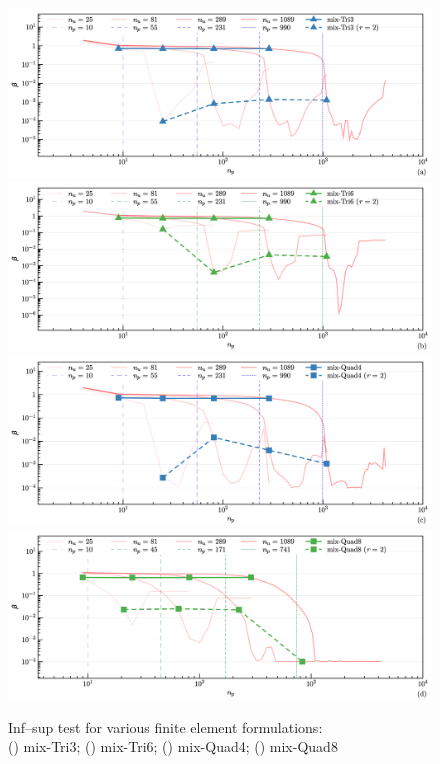 \begin{figure}[!ht]
\centering
\begin{subcaptiongroup}
\includegraphics[width=\textwidth]{png/infsup_tri3.png}\label{a}
\includegraphics[width=\textwidth]{png/infsup_tri6.png}\label{b}
\includegraphics[width=\textwidth]{png/infsup_quad.png}\label{c}
\includegraphics[width=\textwidth]{png/infsup_quad8.png}\label{d}
\end{subcaptiongroup}
\captionsetup{aboveskip=0pt}
\caption{\centering Inf--sup test for various finite element formulations: \\ () mix-Tri3; () mix-Tri6; () mix-Quad4; () mix-Quad8}
\label{infsup_convergence}
\end{figure}


